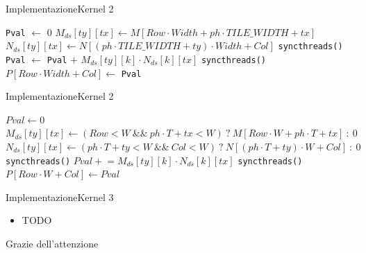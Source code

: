 \documentclass{beamer}
\begin{document}
\begin{frame}{Implementazione}{Kernel 2}
    \begin{algorithm}[H]
        \caption{Tiled Matrix Multiplication Kernel 2}
        \begin{algorithmic}[1]
            \State \texttt{Pval} $\gets$ 0
            \State $M_{ds}[ty][tx] \gets M[Row \cdot Width + ph \cdot TILE\_WIDTH + tx]$
            \State $N_{ds}[ty][tx] \gets N[(ph \cdot TILE\_WIDTH + ty) \cdot Width + Col]$
            \State \texttt{syncthreads()}
            \State \texttt{Pval} $\gets$ \texttt{Pval} $+$ $M_{ds}[ty][k] \cdot N_{ds}[k][tx]$
            \EndFor
            \State \texttt{syncthreads()}
            \EndFor
            \State $P[Row \cdot Width + Col] \gets$ \texttt{Pval}
        \end{algorithmic}
    \end{algorithm}
\end{frame}

\begin{frame}{Implementazione}{Kernel 2}
    \begin{algorithm}[H]
        \scriptsize
        \caption{Tiled Matrix Multiplication Kernel 2 con padding}
        \begin{algorithmic}[1]
            \State $Pval \gets 0$
            \State $M_{ds}[ty][tx] \gets (Row<W~\&\&~ph\cdot T+tx<W)~?~M[Row\cdot W + ph\cdot T + tx]~:~0$
            \State $N_{ds}[ty][tx] \gets (ph\cdot T+ty<W~\&\&~Col<W)~?~N[(ph\cdot T+ty)\cdot W + Col]~:~0$
            \State \texttt{syncthreads()}
            \State $Pval \mathrel{+}= M_{ds}[ty][k] \cdot N_{ds}[k][tx]$
            \EndFor
            \State \texttt{syncthreads()}
            \EndFor
            \State $P[Row\cdot W + Col] \gets Pval$
            \EndIf
        \end{algorithmic}
    \end{algorithm}
\end{frame}

\begin{frame}{Implementazione}{Kernel 3}
    \begin{itemize}
        \item TODO
    \end{itemize}
\end{frame}





\begin{frame}
    \centering \Huge
    Grazie dell'attenzione
\end{frame}
\end{document}
